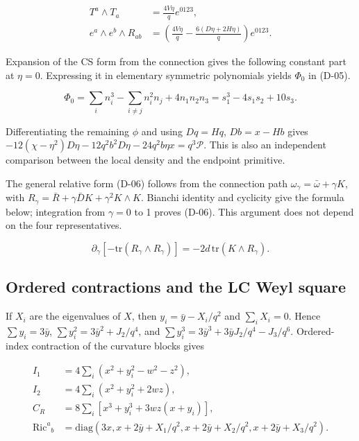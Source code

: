 \begin{equation}\tag{R-03}\label{eq:R-03}
\begin{aligned}
T^a\wedge T_a&=\frac{4V\eta}{q}e^{0123},\\
e^a\wedge e^b\wedge R_{ab}
&=\left(\frac{4V\eta}{q}-\frac{6(D\eta+2H\eta)}q\right)e^{0123}.
\end{aligned}
\end{equation}

Expansion of the CS form from the connection gives the following constant part at $\eta=0$. Expressing it in elementary symmetric polynomials yields $\Phi_0$ in (D-05).

\begin{equation}\tag{R-04}\label{eq:R-04}
\Phi_0=\sum_i n_i^3-\sum_{i\ne j}n_i^2n_j+4n_1n_2n_3
=s_1^3-4s_1s_2+10s_3.
\end{equation}

Differentiating the remaining $\phi$ and using $Dq=Hq$, $Db=x-Hb$ gives $-12(\chi-\eta^2)D\eta-12q^2b^2D\eta-24q^2b\eta x=q^3\mathcal P$. This is also an independent comparison between the local density and the endpoint primitive.

The general relative form (D-06) follows from the connection path $\omega_\gamma=\bar\omega+\gamma K$, with $R_\gamma=\bar R+\gamma\bar D K+\gamma^2K\wedge K$. Bianchi identity and cyclicity give the formula below; integration from $\gamma=0$ to 1 proves (D-06). This argument does not depend on the four representatives.

\begin{equation}\tag{R-05}\label{eq:R-05}
\partial_\gamma[-\mathrm{tr}(R_\gamma\wedge R_\gamma)]
=-2d\,\mathrm{tr}(K\wedge R_\gamma).
\end{equation}

\subsection{Ordered contractions and the LC Weyl square}

If $X_i$ are the eigenvalues of $X$, then $y_i=\bar y-X_i/q^2$ and $\sum_iX_i=0$. Hence $\sum y_i=3\bar y$, $\sum y_i^2=3\bar y^2+J_2/q^4$, and $\sum y_i^3=3\bar y^3+3\bar yJ_2/q^4-J_3/q^6$. Ordered-index contraction of the curvature blocks gives

\begin{equation}\tag{I-06}\label{eq:I-06}
\begin{aligned}
I_1&=4\sum_i(x^2+y_i^2-w^2-z^2),\\
I_2&=4\sum_i(x^2+y_i^2+2wz),\\
C_R&=8\sum_i[x^3+y_i^3+3wz(x+y_i)],\\
\mathrm{Ric}^a{}_b&=\mathrm{diag}
 (3x,x+2\bar y+X_1/q^2,x+2\bar y+X_2/q^2,x+2\bar y+X_3/q^2).
\end{aligned}
\end{equation}

